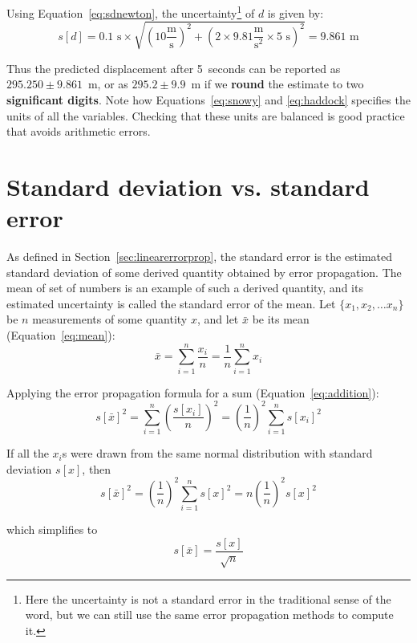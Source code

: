 \begin{enumerate}
  Using Equation~\ref{eq:sdnewton}, the uncertainty\footnote{Here the
    uncertainty is not a standard error in the traditional sense of
    the word, but we can still use the same error propagation methods
    to compute it.} of $d$ is given by:
  \begin{equation}
    s[d] = 0.1\mbox{~s} \times 
    \sqrt{\left(10 \frac{\mbox{m}}{\mbox{s}}\right)^2 + 
      \left(2 \times 9.81\frac{\mbox{m}}{\mbox{s}^2} \times
      5\mbox{~s}\right)^2} = 9.861\mbox{~m}
  \label{eq:haddock}
  \end{equation}

  Thus the predicted displacement after 5~seconds can be reported as
  $295.250\pm{9.861}$~m, or as $295.2\pm{9.9}$~m if we \textbf{round}
  the estimate to two \textbf{significant digits}. Note how
  Equations~\ref{eq:snowy} and \ref{eq:haddock} specifies the units of
  all the variables. Checking that these units are balanced is good
  practice that avoids arithmetic errors.
  
\end{enumerate}

\section{Standard deviation vs. standard error}
\label{sec:stderr}

As defined in Section~\ref{sec:linearerrorprop}, the standard error is
the estimated standard deviation of some derived quantity obtained by
error propagation. The mean of set of numbers is an example of such a
derived quantity, and its estimated uncertainty is called the standard
error of the mean.  Let $\{x_1,x_2, \ldots x_n\}$ be $n$ measurements
of some quantity $x$, and let $\bar{x}$ be its mean
(Equation~\ref{eq:mean}):
\[
\bar{x} = \sum\limits_{i=1}^n \frac{x_i}{n} = \frac{1}{n} \sum\limits_{i=1}^n x_i
\]

Applying the error propagation formula for a sum
(Equation~\ref{eq:addition}):
\[
s[\bar{x}]^2 = \sum\limits_{i=1}^{n}\left(\frac{s[x_i]}{n}\right)^2 =
\left(\frac{1}{n}\right)^2 \sum\limits_{i=1}^{n}s[x_i]^2
\]

If all the $x_i$s were drawn from the same normal distribution with
standard deviation $s[x]$, then
\[
s[\bar{x}]^2 = \left(\frac{1}{n}\right)^2 \sum\limits_{i=1}^{n}s[x]^2 =
n \left(\frac{1}{n}\right)^2 s[x]^2
\]

\noindent which simplifies to
\begin{equation}
  s[\bar{x}] = \frac{s[x]}{\sqrt{n}}
  \label{eq:stderrmean}
\end{equation}

